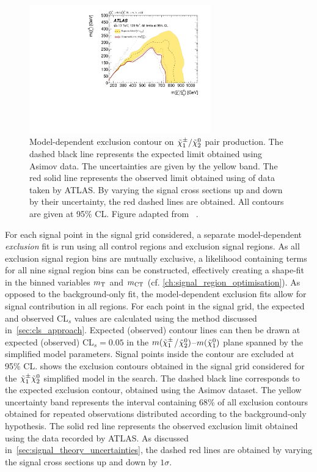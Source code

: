  \begin{figure}
	\centering\includegraphics[width=0.7\textwidth]{contourPlotterWh1Lbb}
	\caption{Model-dependent exclusion contour on $\tilde{\chi}_1^\pm/\tilde{\chi}_2^0$ pair production. The dashed black line represents the expected limit obtained using Asimov data. The uncertainties are given by the yellow band. The red solid line represents the observed limit obtained using \onethirtynineifb of data taken by ATLAS. By varying the signal cross sections up and down by their uncertainty, the red dashed lines are obtained. All contours are given at 95\% CL. Figure adapted from ~\cite{SUSY-2019-08}.}
	\label{fig:result_exclusion}
\end{figure}

For each signal point in the signal grid considered, a separate model-dependent \textit{exclusion} fit is run using all control regions and exclusion signal regions.
As all exclusion signal region bins are mutually exclusive, a likelihood containing terms for all nine signal region bins can be constructed, effectively creating a shape-fit in the binned variables $m_{\textrm{T}}$ and $m_{\textrm{CT}}$ (cf. \cref{ch:signal_region_optimisation}).
As opposed to the background-only fit, the model-dependent exclusion fits allow for signal contribution in all regions.
For each point in the signal grid, the expected and observed CL$_s$ values are calculated using the method discussed in~\cref{sec:cls_approach}.
Expected (observed) contour lines can then be drawn at expected (observed) CL$_s =0.05$ in the \mbox{$m(\tilde{\chi}_1^\pm$/$\tilde{\chi}_2^0)$--$m(\tilde{\chi}_1^0)$} plane spanned by the simplified model parameters.
Signal points inside the contour are excluded at 95\% CL. 
 shows the exclusion contours obtained in the signal grid considered for the $\tilde{\chi}_1^\pm\tilde{\chi}_2^0$ simplified model in the \onelepton search.
The dashed black line corresponds to the expected exclusion contour, obtained using the Asimov dataset. The yellow uncertainty band represents the interval containing 68\% of all exclusion contours obtained for repeated observations distributed according to the background-only hypothesis. 
The solid red line represents the observed exclusion limit obtained using the data recorded by ATLAS. As discussed in~\cref{sec:signal_theory_uncertainties}, the dashed red lines are obtained by varying the signal cross sections up and down by $1\sigma$.

